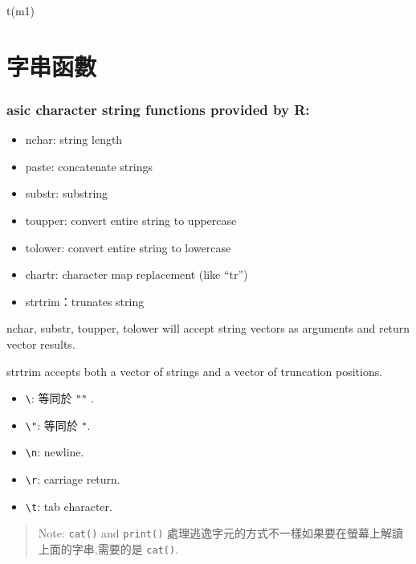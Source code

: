 \documentclass[]{book}
\providecommand{\tightlist}{%
  \setlength{\itemsep}{0pt}\setlength{\parskip}{0pt}}
\theoremstyle{definition}
\theoremstyle{definition}
\theoremstyle{definition}
\theoremstyle{remark}
\begin{document}
t(m1)

\section{字串函數}

\hypertarget{asic-character-string-functions-provided-by-r}{%
\subsubsection{asic character string functions provided by
R:}\label{asic-character-string-functions-provided-by-r}}

\begin{itemize}
\tightlist
\item
  nchar: string length\\
\item
  paste: concatenate strings
\item
  substr: substring
\item
  toupper: convert entire string to uppercase
\item
  tolower: convert entire string to lowercase
\item
  chartr: character map replacement (like ``tr'')
\item
  strtrim：trunates string
\end{itemize}

nchar, substr, toupper, tolower will accept string vectors as arguments
and return vector results.

strtrim accepts both a vector of strings and a vector of truncation
positions.

\begin{itemize}
\tightlist
\item
  \texttt{\textbackslash{}\textquotesingle{}}: 等同於
  \texttt{"\textquotesingle{}"} .\\
\item
  \texttt{\textbackslash{}"}: 等同於
  \texttt{\textquotesingle{}"\textquotesingle{}}.\\
\item
  \texttt{\textbackslash{}n}: newline.\\
\item
  \texttt{\textbackslash{}r}: carriage return.\\
\item
  \texttt{\textbackslash{}t}: tab character.
\end{itemize}

\begin{quote}
Note: \texttt{cat()} and \texttt{print()}
處理逃逸字元的方式不一樣如果要在螢幕上解讀上面的字串,需要的是
\texttt{cat()}.
\end{quote}
\end{document}
